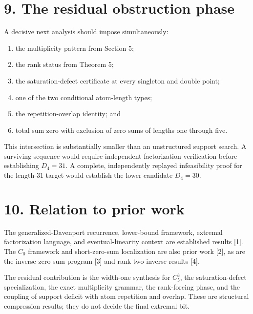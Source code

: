\documentclass[
  11pt,
]{article}
\providecommand{\tightlist}{%
  \setlength{\itemsep}{0pt}\setlength{\parskip}{0pt}}
\begin{document}
\hypertarget{the-residual-obstruction-phase}{%
\section{9. The residual obstruction
phase}\label{the-residual-obstruction-phase}}

A decisive next analysis should impose simultaneously:

\begin{enumerate}
\def\labelenumi{\arabic{enumi}.}
\tightlist
\item
  the multiplicity pattern from Section 5;
\item
  the rank status from Theorem 5;
\item
  the saturation-defect certificate at every singleton and double point;
\item
  one of the two conditional atom-length types;
\item
  the repetition-overlap identity; and
\item
  total sum zero with exclusion of zero sums of lengths one through
  five.
\end{enumerate}

This intersection is substantially smaller than an unstructured support
search. A surviving sequence would require independent factorization
verification before establishing \(D_4=31\). A complete, independently
replayed infeasibility proof for the length-31 target would establish
the lower candidate \(D_4=30\).

\hypertarget{relation-to-prior-work}{%
\section{10. Relation to prior work}\label{relation-to-prior-work}}

The generalized-Davenport recurrence, lower-bound framework, extremal
factorization language, and eventual-linearity context are established
results {[}1{]}. The \(C_0\) framework and short-zero-sum localization
are also prior work {[}2{]}, as are the inverse zero-sum program {[}3{]}
and rank-two inverse results {[}4{]}.

The residual contribution is the width-one synthesis for \(C_5^3\), the
saturation-defect specialization, the exact multiplicity grammar, the
rank-forcing phase, and the coupling of support deficit with atom
repetition and overlap. These are structural compression results; they
do not decide the final extremal bit.
\end{document}
